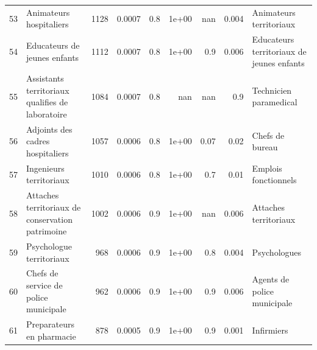 \documentclass[11pt,a4paper]{article}
\begin{document}
\begin{tabular}{llrrrrrrl}
	53  &                            Animateurs hospitaliers &           1128 &         0.0007 &                    0.8 &              1e+00 &                               nan &                                    0.004 &                            Animateurs territoriaux \\
	54  &                       Educateurs de jeunes enfants &           1112 &         0.0007 &                    0.8 &              1e+00 &                               0.9 &                                    0.006 &          Educateurs territoriaux de jeunes enfants \\
	55  &   Assistants territoriaux qualifies de laboratoire &           1084 &         0.0007 &                    0.8 &                nan &                               nan &                                      0.9 &                             Technicien paramedical \\
	56  &                   Adjoints des cadres hospitaliers &           1057 &         0.0006 &                    0.8 &              1e+00 &                              0.07 &                                     0.02 &                                    Chefs de bureau \\
	57  &                            Ingenieurs territoriaux &           1010 &         0.0006 &                    0.8 &              1e+00 &                               0.7 &                                     0.01 &                               Emplois fonctionnels \\
	58  &   Attaches territoriaux de conservation patrimoine &           1002 &         0.0006 &                    0.9 &              1e+00 &                               nan &                                    0.006 &                              Attaches territoriaux \\
	59  &                           Psychologue territoriaux &            968 &         0.0006 &                    0.9 &              1e+00 &                               0.8 &                                    0.004 &                                       Psychologues \\
	60  &              Chefs de service de police municipale &            962 &         0.0006 &                    0.9 &              1e+00 &                               0.9 &                                    0.006 &                        Agents de police municipale \\
	61  &                          Preparateurs en pharmacie &            878 &         0.0005 &                    0.9 &              1e+00 &                               0.9 &                                    0.001 &                                         Infirmiers \\

\end{tabular}
\end{document}
